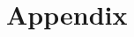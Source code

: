 \documentclass{article}\usepackage[]{graphicx}\usepackage[]{xcolor}
\begin{document}
\begin{multicols}{2}
\vspace{2em}

\begin{tiny}

\end{tiny}
\end{multicols}

\newpage
\onecolumn
\section{Appendix}
\end{document}
